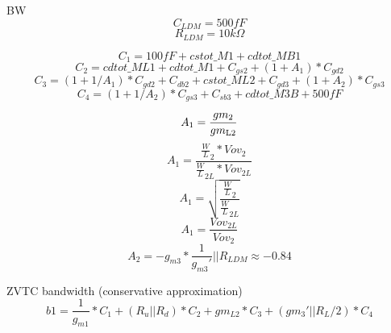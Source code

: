 \documentclass[fleqn]{article}
\begin{document}
\begin{flushleft}
BW
\begin{equation}
C_{LDM} = 500fF
\end{equation}
\begin{equation}
R_{LDM} = 10k\Omega
\end{equation}

\begin{equation}
C_1 = 100fF + cstot\_M1 + cdtot\_MB1
\end{equation}
\begin{equation}
C_2 = cdtot\_ML1 + cdtot\_M1 +  C_{gs2} + (1 + A_1)*C_{gd2} 
\end{equation}
\begin{equation}
C_3 = (1 + 1/A_1)*C_{gd2} + C_{db2} + cstot\_ML2 + C_{gd3} + (1 + A_2)*C_{gs3}
\end{equation}
\begin{equation}
C_4 = (1 + 1/A_2)*C_{gs3} + C_{sb3} + cdtot\_M3B + 500fF
\end{equation}

\begin{equation}
A_1 = \frac{ gm_{2} }{ gm\textsubscript{L2} }
\end{equation}
\begin{equation}
A_1 = \frac{ \frac{W}{L}_2*Vov_2 }{ \frac{W}{L}_{2L}*Vov_{2L} }
\end{equation}
\begin{equation}
A_1 = \sqrt{ \frac{ \frac{W}{L}_2 }{ \frac{W}{L}_{2L} } }
\end{equation}
\begin{equation}
A_1 = \frac{ Vov_{2L} }{ Vov_{2} }
\end{equation}
\begin{equation}
A_2 = -g_{m3}*\frac{1}{g_{m3}'}||R_{LDM} \approx -0.84
\end{equation}


ZVTC bandwidth (conservative approximation)
\begin{equation}
b1 = \frac{1}{g_{m1}}*C_1 + (R_u || R_d)*C_2 + gm_{L2}*C_3 + (gm_3'||R_L/2)*C_4
\end{equation}


\end{flushleft}
\end{document}
